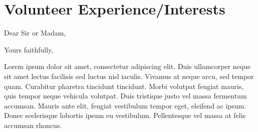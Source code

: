 \documentclass[10pt,letterpaper,sans]{moderncv}        %
\begin{document}
\section{Volunteer Experience/Interests}



\clearpage
\date{January 01, 1984}
\opening{Dear Sir or Madam,}
\closing{Yours faithfully,}
\makelettertitle

Lorem ipsum dolor sit amet, consectetur adipiscing elit. Duis ullamcorper neque sit amet lectus facilisis sed luctus nisl iaculis. Vivamus at neque arcu, sed tempor quam. Curabitur pharetra tincidunt tincidunt. Morbi volutpat feugiat mauris, quis tempor neque vehicula volutpat. Duis tristique justo vel massa fermentum accumsan. Mauris ante elit, feugiat vestibulum tempor eget, eleifend ac ipsum. Donec scelerisque lobortis ipsum eu vestibulum. Pellentesque vel massa at felis accumsan rhoncus.
\end{document}
